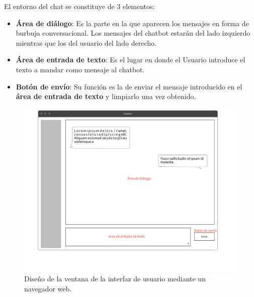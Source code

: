 El entorno del chat se constituye de 3 elementos:

\begin{itemize}
    \item \textbf{Área de diálogo}: Es la parte en la que aparecen los mensajes en forma de burbuja conversacional. Los mensajes del chatbot estarán del lado izquierdo mientras que los del usuario del lado derecho.
    \item \textbf{Área de entrada de texto}: Es el lugar en donde el Usuario introduce el texto a mandar como mensaje al chatbot.
    \item \textbf{Botón de envío}: Su función es la de enviar el mensaje introducido en el \textbf{área de entrada de texto} y limpiarlo una vez obtenido.
\end{itemize}

\begin{figure}[ht]
    \centering
    \includegraphics[scale=0.425]{images/5/interfaz-usuario}
    \caption{Diseño de la ventana de la interfaz de usuario mediante un navegador web.}
    \label{fig:interfaz-usuario}
\end{figure}



